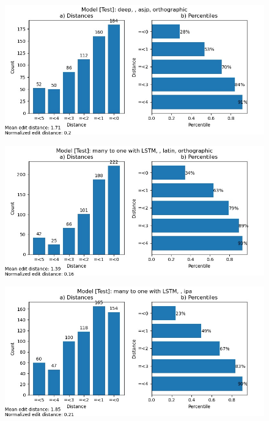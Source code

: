 \begin{figure}
    \centering
    \includegraphics[width=\textwidth]{ciobanu_deep_test_asjp_ortho.jpg}
    \label{fig:sdtao}
\end{figure}

\begin{figure}
    \centering
    \includegraphics[width=\textwidth]{ciobanu_deep_test_latin_ortho.jpg}
    \label{fig:sdtlo}
\end{figure}

\begin{figure}
    \centering
    \includegraphics[width=\textwidth]{ciobanu_many2one_test_ipa.jpg}
    \label{fig:sdti}
\end{figure}

